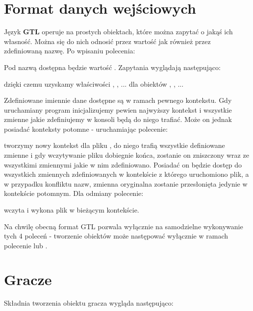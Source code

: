 \documentclass{standalone}
\begin{document}
\section{Format danych wejściowych}

Język \textbf{GTL} operuje na prostych obiektach, które można zapytać o jakąś ich własność. Można się do nich odnosić przez wartość jak również
przez zdefiniowaną nazwę. Po wpisaniu polecenia:


Pod nazwą  dostępna będzie wartość . Zapytania wyglądają następująco:


dzięki czemu uzyskamy właściwości , , ... dla obiektów , , ...

Zdefiniowane imiennie dane dostępne są w ramach pewnego kontekstu. Gdy uruchamiany program inicjalizujemy pewien najwyższy kontekst i wszystkie
zmienne jakie zdefiniujemy w konsoli będą do niego trafiać. Może on jednak posiadać konteksty potomne - uruchamiając polecenie:


tworzymy nowy kontekst dla pliku , do niego trafią wszystkie definiowane zmienne i gdy wczytywanie pliku dobiegnie końca, zostanie on
zniszczony wraz ze wszystkimi zmiennymi jakie w nim zdefiniowano. Posiadać on będzie dostęp do wszystkich zmiennych zdefiniowanych w kontekście
z którego uruchomiono plik, a w przypadku konfliktu nazw, zmienna oryginalna zostanie przesłonięta jedynie w kontekście potomnym. Dla odmiany
polecenie:


wczyta i wykona plik w bieżącym kontekście.

Na chwilę obecną format GTL pozwala wyłącznie na samodzielne wykonywanie tych 4 poleceń - tworzenie obiektów może następować wyłącznie w ramach
polecenie  lub .

\section{Gracze}

Składnia tworzenia obiektu gracza wygląda następująco:

\end{document}
